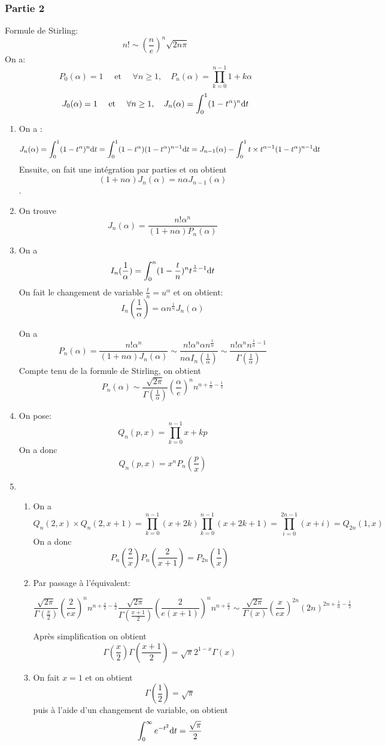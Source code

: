 \documentclass{article}
\def \de {{\rm d}}
\begin{document}
\subsubsection*{Partie 2}
Formule de Stirling:
\[n!\sim \left(\frac ne\right)^n\sqrt{2n\pi}\]
On a:
\[P_0(\alpha)=1\quad\mbox{ et }\quad \forall n\geq 1,\quad P_n(\alpha)=\prod_{k=0}^{n-1}1+k\alpha\]
\[J_0(\alpha)=1\quad\mbox{ et }\quad \forall n\geq 1,\quad J_n(\alpha)=\int_{0}^{1}(1-t^\alpha)^n\de t\]
\begin{enumerate}
\item On a : 
\[ J_n(\alpha)=\int_{0}^{1}(1-t^\alpha)^n\de t = \int_{0}^{1}(1-t^\alpha)(1-t^\alpha)^{n-1}\de t=  J_{n-1}(\alpha) - \int_{0}^{1}t\times t^{\alpha-1}(1-t^\alpha)^{n-1}\de t\]
Ensuite, on fait une intégration par parties et on obtient
\[(1+n\alpha)J_n(\alpha)= n\alpha J_{n-1}(\alpha)\].
\item On trouve
\[J_n(\alpha)=\frac{n!\alpha^n}{(1+n\alpha)P_n(\alpha)}\]
\item On a 
\[I_n(\frac{1}{\alpha})=\int_0^n (1-\frac{t}{n})^{n}t^{\frac{1}{\alpha}-1}\de t\]
On fait le changement de variable $\frac tn=u^\alpha$ et on obtient:
\[I_n(\frac{1}{\alpha})=\alpha n^{\frac{1}{\alpha}}J_n(\alpha)\]

On a
\[P_n(\alpha)=\frac{n!\alpha^n}{(1+n\alpha)J_n(\alpha)} \sim \frac{n!\alpha^n \alpha n^{\frac{1}{\alpha}}}{n\alpha I_n(\frac 1{\alpha})} \sim \frac{n!\alpha^n  n^{\frac{1}{\alpha}-1}}{ \Gamma(\frac 1{\alpha})} \]
Compte tenu de la formule de Stirling, on obtient
\[P_n(\alpha) \sim \frac{\sqrt{2\pi}}{ \Gamma(\frac 1{\alpha})} \left(\frac{\alpha}{e}\right)^n  n^{n+\frac{1}{\alpha}-\frac 12} \]
\item On pose:
\[Q_n(p,x)=\prod_{k=0}^{n-1}x+kp\]
On a donc
\[Q_n(p,x)=x^nP_n(\frac px)\]

\item \begin{enumerate}
\item On a
\[Q_n(2,x)\times  Q_n(2,x+1)=\prod_{k=0}^{n-1}(x+2k)\prod_{k=0}^{n-1}(x+2k+1) =\prod_{i=0}^{2n-1}(x+i)=Q_{2n}(1,x)\]
On a donc
\[P_n(\frac 2x)P_n(\frac 2{x+1})=P_{2n}(\frac 1x)\]
\item Par passage à l'équivalent:

\[\frac{\sqrt{2\pi}}{ \Gamma(\frac x2)} \left(\frac{2}{ex}\right)^n  n^{n+\frac x2-\frac 12} \frac{\sqrt{2\pi}}{ \Gamma(\frac {x+1}2)} \left(\frac{2}{e(x+1)}\right)^n  n^{n+\frac {x}2}\sim \frac{\sqrt{2\pi}}{ \Gamma(x)} \left(\frac{x}{ex}\right)^{2n}  (2n)^{2n+\frac{1}{\alpha}-\frac 12} \]


Après simplification on obtient
 \[\Gamma(\frac x2)\Gamma(\frac {x+1}2) =\sqrt\pi 2^{1-x} \Gamma(x)\]
\item On fait $x=1$ et on obtient
\[\Gamma(\frac 12)=\sqrt\pi\]
puis à l'aide d'un changement de variable, on obtient 
\[\int_0^\infty e^{-t^2}\de t=\frac{\sqrt\pi}{2}\]
\end{enumerate}
\end{enumerate}
  
\end{document}
